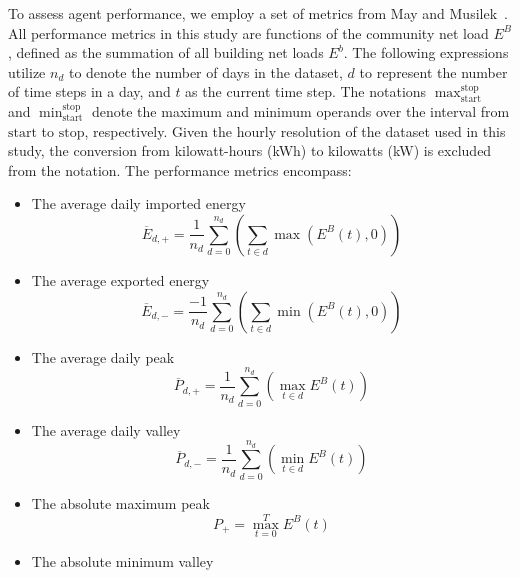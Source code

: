 \documentclass[preprint, 12pt]{elsarticle}
\newcommand{\start}{\text{start}}
\newcommand{\stopp}{\text{stop}}
\begin{document}
To assess agent performance, we employ a set of metrics from May and Musilek~\cite{ALEXV2}. All performance metrics in this study are functions of the community net load $E^{B}$, defined as the summation of all building net loads $E^{b}$. The following expressions utilize $n_d$ to denote the number of days in the dataset, $d$ to represent the number of time steps in a day, and $t$ as the current time step. The notations $\max_{\start}^{\stopp}$ and $\min_{\start}^{\stopp}$ denote the maximum and minimum operands over the interval from $\start$ to $\stopp$, respectively. Given the hourly resolution of the dataset used in this study, the conversion from kilowatt-hours (kWh) to kilowatts (kW) is excluded from the notation. The performance metrics encompass:
\begin{itemize}
    \item The average daily imported energy
        \begin{equation}
            \label{eq:AvgDailyImportedEnergy_Alex3}
            \overline{E}_{d, +}=  \frac{1}{n_d} \sum_{d=0}^{n_d} \left( \sum_{t \in d} \max(E^B(t),0) \right)
        \end{equation}
    \item The average exported energy
        \begin{equation}
            \label{eq:AvgDailyExportedEnergy_Alex3}
            \overline{E}_{d, -}=  \frac{-1}{n_d} \sum_{d=0}^{n_d} \left( \sum_{t \in d} \min(E^B(t),0) \right)
        \end{equation}
    \item The average daily peak
        \begin{equation}
        \label{eq:AvgDailyPeak_Alex3}
            \overline{P}_{d,+} = \frac{1}{n_d} \sum_{d=0}^{n_d} \left( \max_{t \in d } E^B(t) \right)
        \end{equation}
    \item The average daily valley
        \begin{equation}
        \label{eq:AvgDailyValley_Alex3}
            \overline{P}_{d,-} = \frac{1}{n_d} \sum_{d=0}^{n_d} \left( \min_{t \in d } E^B(t) \right)
        \end{equation}
    \item The absolute maximum peak
        \begin{equation}
            \label{eq:MaxPeak_Alex3}
            P_{+} = \max_{t=0}^{T} E^B(t)
        \end{equation}
    \item The absolute minimum valley 

\end{itemize}
\end{document}
